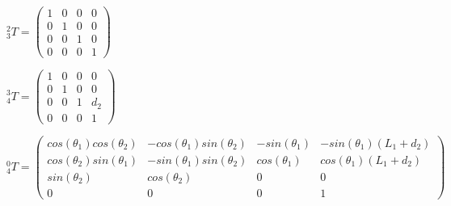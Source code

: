 \documentclass[8pt]{article}
\begin{document}
\begin{list}{()~}{}
$^2_3T = \left( \begin{array}{cccc}
1 & 0 &0&0\\
0&1&0&0\\
0 & 0 & 1 & 0\\
0&0&0&1
\end{array} \right) $

$^3_4T = \left( \begin{array}{cccc}
1 & 0 &0&0\\
0&1&0&0\\
0 & 0 & 1 & d_2\\
0&0&0&1
\end{array} \right) $

$^0_4T = \left( \begin{array}{cccc}
cos(\theta_1)cos(\theta_2)& -cos(\theta_1)sin(\theta_2)& -sin(\theta_1)& -sin(\theta_1)(L_1 + d_2)\\
 cos(\theta_2)sin(\theta_1)& -sin(\theta_1)sin(\theta_2)&  cos(\theta_1)&  cos(\theta_1)(L_1 + d_2)\\
sin(\theta_2)& cos(\theta_2)& 0 & 0\\
0 & 0 & 0 & 1
\end{array} \right) $


\medskip

\end{list}
\end{document}
